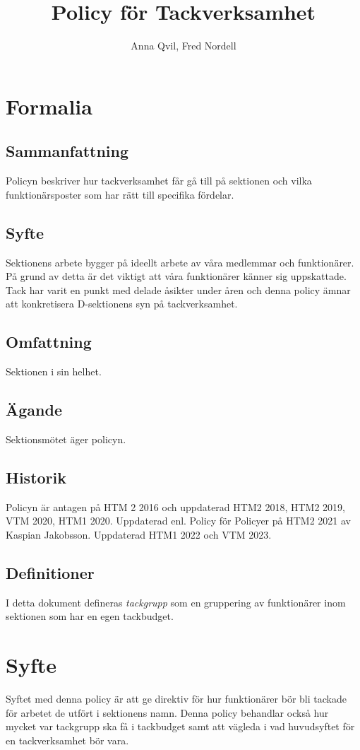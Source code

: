 \documentclass{dsekprotokoll}
\title{Policy för Tackverksamhet}
\author{Anna Qvil, Fred Nordell}
\begin{document}
\maketitle
\section{Formalia}
\subsection{Sammanfattning}
Policyn beskriver hur tackverksamhet får gå till på sektionen och vilka funktionärsposter som har rätt till specifika fördelar.

\subsection{Syfte}
Sektionens arbete bygger på ideellt arbete av våra medlemmar och funktionärer. På grund av detta är det viktigt att våra funktionärer känner sig uppskattade. Tack har varit en punkt med delade åsikter under åren och denna policy ämnar att konkretisera D-sektionens syn på tackverksamhet.

\subsection{Omfattning}
Sektionen i sin helhet.

\subsection{Ägande}
Sektionsmötet äger policyn.
\subsection{Historik}
Policyn är antagen på HTM 2 2016 och uppdaterad HTM2 2018, HTM2 2019, VTM 2020, HTM1 2020.
Uppdaterad enl. Policy för Policyer på HTM2 2021 av Kaspian Jakobsson.
Uppdaterad HTM1 2022 och VTM 2023.

\subsection{Definitioner}
I detta dokument defineras \textit{tackgrupp} som en gruppering
av funktionärer inom sektionen som har en egen tackbudget.



\section{Syfte}
Syftet med denna policy är att ge direktiv för hur funktionärer bör  bli tackade för arbetet de utfört i sektionens namn. Denna policy behandlar också hur mycket var tackgrupp ska få i tackbudget samt att vägleda i vad huvudsyftet för en tackverksamhet bör vara.
\end{document}
